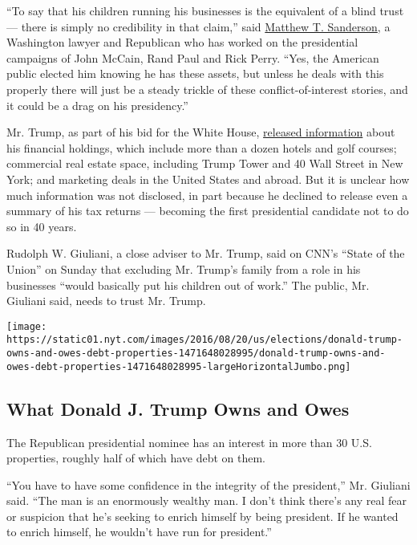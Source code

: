 ``To say that his children running his businesses is the equivalent of a
blind trust --- there is simply no credibility in that claim,'' said
\href{http://www.capdale.com/msanderson}{Matthew T. Sanderson}, a
Washington lawyer and Republican who has worked on the presidential
campaigns of John McCain, Rand Paul and Rick Perry. ``Yes, the American
public elected him knowing he has these assets, but unless he deals with
this properly there will just be a steady trickle of these
conflict-of-interest stories, and it could be a drag on his
presidency.''

Mr. Trump, as part of his bid for the White House,
\href{http://www.nytimes.com/interactive/2016/05/18/us/politics/trump-financial-disclosure.html}{released
information} about his financial holdings, which include more than a
dozen hotels and golf courses; commercial real estate space, including
Trump Tower and 40 Wall Street in New York; and marketing deals in the
United States and abroad. But it is unclear how much information was not
disclosed, in part because he declined to release even a summary of his
tax returns --- becoming the first presidential candidate not to do so
in 40 years.

Rudolph W. Giuliani, a close adviser to Mr. Trump, said on CNN's ``State
of the Union'' on Sunday that excluding Mr. Trump's family from a role
in his businesses ``would basically put his children out of work.'' The
public, Mr. Giuliani said, needs to trust Mr. Trump.

\href{https://www.nytimes.com/interactive/2016/08/20/us/elections/donald-trump-owns-and-owes-debt-properties.html}{}

\texttt{[image: https://static01.nyt.com/images/2016/08/20/us/elections/donald-trump-owns-and-owes-debt-properties-1471648028995/donald-trump-owns-and-owes-debt-properties-1471648028995-largeHorizontalJumbo.png]}

\hypertarget{what-donald-j-trump-owns-and-owes}{%
\subsection{What Donald J. Trump Owns and
Owes}\label{what-donald-j-trump-owns-and-owes}}

The Republican presidential nominee has an interest in more than 30 U.S.
properties, roughly half of which have debt on them.

``You have to have some confidence in the integrity of the president,''
Mr. Giuliani said. ``The man is an enormously wealthy man. I don't think
there's any real fear or suspicion that he's seeking to enrich himself
by being president. If he wanted to enrich himself, he wouldn't have run
for president.''

